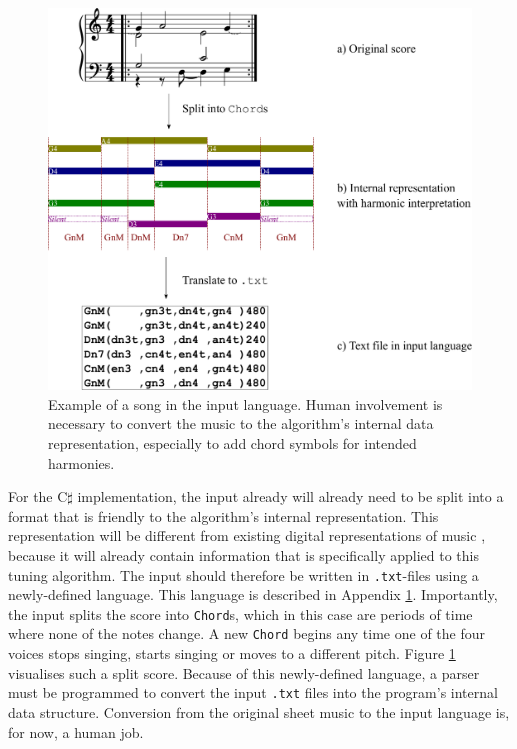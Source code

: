 \documentclass[a4paper]{article}
\begin{document}
\begin{figure}
	\centering
	\includegraphics[height=0.35\textheight]{Figures/benedettiV.pdf}
	\caption{Example of a song in the input language. Human involvement is necessary to convert the music to the algorithm's internal data representation, especially to add chord symbols for intended harmonies.}
	\label{fig:input}
\end{figure}

For the C$\sharp$ implementation, the input already will already need to be split into a format that is friendly to the algorithm's internal representation. This representation will be different from existing digital representations of music \cite{midi_manufacturers_association_complete_2014, de_haas_music_2012, hsiao_compound_2021}, because it will already contain information that is specifically applied to this tuning algorithm. The input should therefore be written in \texttt{.txt}-files using a newly-defined language. This language is described in Appendix \ref{fig:input}. Importantly, the input splits the score into \texttt{Chord}s, which in this case are periods of time where none of the notes change. A new \texttt{Chord} begins any time one of the four voices stops singing, starts singing or moves to a different pitch. Figure \ref{fig:input} visualises such a split score. Because of this newly-defined language, a parser must be programmed to convert the input \texttt{.txt} files into the program's internal data structure. Conversion from the original sheet music to the input language is, for now, a human job.
\end{document}
